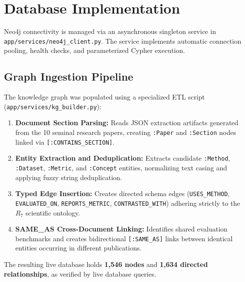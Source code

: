 \documentclass[12pt,a4paper,oneside]{report}
\begin{document}
\section{Database Implementation}
Neo4j connectivity is managed via an asynchronous singleton service in \texttt{app/services/neo4j_client.py}. The service implements automatic connection pooling, health checks, and parameterized Cypher execution.

\subsection{Graph Ingestion Pipeline}
The knowledge graph was populated using a specialized ETL script (\texttt{app/services/kg_builder.py}):
\begin{enumerate}
    \item \textbf{Document Section Parsing:} Reads JSON extraction artifacts generated from the 10 seminal research papers, creating \texttt{:Paper} and \texttt{:Section} nodes linked via \texttt{[:CONTAINS_SECTION]}.
    \item \textbf{Entity Extraction and Deduplication:} Extracts candidate \texttt{:Method}, \texttt{:Dataset}, \texttt{:Metric}, and \texttt{:Concept} entities, normalizing text casing and applying fuzzy string deduplication.
    \item \textbf{Typed Edge Insertion:} Creates directed schema edges (\texttt{USES\_METHOD}, \texttt{EVALUATED\_ON}, \texttt{REPORTS\_METRIC}, \texttt{CONTRASTED\_WITH}) adhering strictly to the $R_7$ scientific ontology.
    \item \textbf{SAME\_AS Cross-Document Linking:} Identifies shared evaluation benchmarks and creates bidirectional \texttt{[:SAME_AS]} links between identical entities occurring in different publications.
\end{enumerate}

The resulting live database holds \textbf{1,546 nodes} and \textbf{1,634 directed relationships}, as verified by live database queries.
\end{document}
